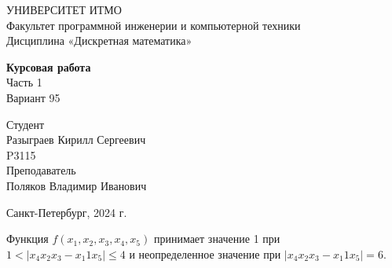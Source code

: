 \documentclass{article}
\begin{document}
\begin{center}
    УНИВЕРСИТЕТ ИТМО \\
    Факультет программной инженерии и компьютерной техники \\
    Дисциплина «Дискретная математика»

    \vspace{5cm}

    \large
    \textbf{Курсовая работа} \\
    Часть 1 \\
    Вариант 95
\end{center}

\vspace{2cm}

\hfill\begin{minipage}{0.35\linewidth}
Студент \\
Разыграев Кирилл Сергеевич \\
P3115 \\

Преподаватель \\
Поляков Владимир Иванович
\end{minipage}

\vfill

\begin{center}
    Санкт-Петербург, 2024 г.
\end{center}

\thispagestyle{empty}
\newpage

Функция $f(x_1,x_2,x_3,x_4,x_5)$ принимает значение 1 при $1 < |x_4 x_2 x_3 - x_1 1 x_5| \le 4$ и неопределенное значение при $|x_4 x_2 x_3 - x_1 1 x_5| = 6$.
\end{document}
